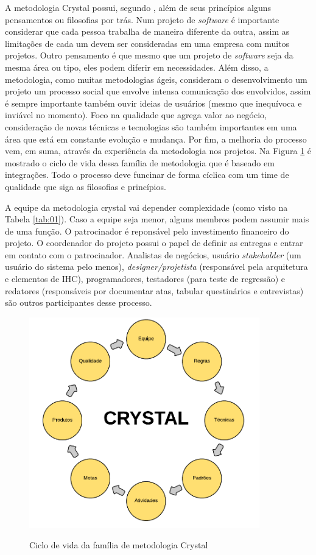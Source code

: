 A metodologia Crystal possui, segundo , além de seus princípios alguns pensamentos ou filosofias por trás. Num projeto de \textit{software} é importante considerar que cada pessoa trabalha de maneira diferente da outra, assim as limitações de cada um devem ser consideradas em uma empresa com muitos projetos. Outro pensamento é que mesmo que um projeto de \textit{software} seja da mesma área ou tipo, eles podem diferir em necessidades. Além disso, a metodologia, como muitas metodologias ágeis, consideram o desenvolvimento um projeto um processo social que envolve intensa comunicação dos envolvidos, assim é sempre importante também ouvir ideias de usuários (mesmo que inequívoca e inviável no momento). Foco na qualidade que agrega valor ao negócio, consideração de novas técnicas e tecnologias são também importantes em uma área que está em constante evolução e mudança. Por fim, a melhoria do processo vem, em suma, através da experiência da metodologia nos projetos. Na Figura \ref{fig:11} é mostrado o ciclo de vida dessa família de metodologia que é baseado em integrações. Todo o processo deve funcinar de forma cíclica com um time de qualidade que siga as filosofias e princípios.

A equipe da metodologia crystal vai depender complexidade (como visto na Tabela \ref{tab:01}). Caso a equipe seja menor, alguns membros podem assumir mais de uma função. O patrocinador é reponsável pelo investimento financeiro do projeto. O coordenador do projeto possui o papel de definir as entregas e entrar em contato com o patrocinador. Analistas de negócios, usuário \textit{stakeholder} (um usuário do sistema pelo menos), \textit{designer/projetista} (responsável pela arquitetura e elementos de IHC), programadores, testadores (para teste de regressão) e redatores (responsáveis por documentar atas, tabular questinários e entrevistas) são outros participantes desse processo. \cite{macedo:12}


\begin{figure}[htb!]
\begin{center}
\caption{Ciclo de vida da família de metodologia Crystal}
\label{fig:11}
\includegraphics[width=10cm]{assets/crystal} \\
\end{center}
\end{figure}


